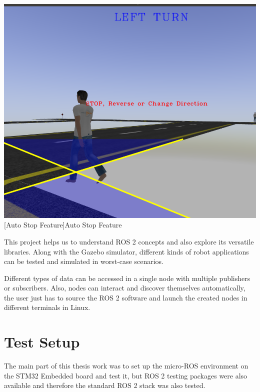 \documentclass[%
xelatex,
	oneside,		%
	12pt,			%
	parskip=half,	%
	abstracton,
	chapterprefix=true%
    appendixprefix=true]
{scrbook}
\begin{document}
			\begin{center}
\includegraphics[scale=0.3]{fig/final2adas.png}
[Auto Stop Feature]{Auto Stop Feature}
\label{fig:lane1}
\end{center}
This project helps us to understand ROS 2 concepts and also explore its versatile libraries. Along with the Gazebo simulator, different kinds of robot applications can be tested and simulated in worst-case scenarios. 

Different types of data can be accessed in a single node with multiple publishers or subscribers. Also, nodes can interact and discover themselves automatically, the user just has to source the ROS 2 software and launch the created nodes in different terminals in Linux.
	\chapter{Test Setup}
		
\rofoot[\pagemark]{\pagemark}
The main part of this thesis work was to set up the micro-ROS environment on the STM32 Embedded board and test it, but ROS 2 testing packages were also available and therefore the standard ROS 2 stack was also tested.
	
\end{document}
